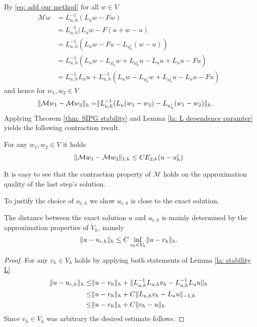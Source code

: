 By \eqref{eq: add our method} for all $w \in V$
\begin{align}
	\mathcal M w &= L_{u,h}^{-1}(L_u w - Fw) \nonumber\\
				 &= L_{u,h}^{-1}(L_u w - F(u+w-u) \nonumber\\
				 &= L_{u,h}^{-1}(L_u w - Fu - L_{u^i_h} (w-u)) \nonumber\\
				 &=  L_{u,h}^{-1}(L_u w - L_{u^i_h} w + L_{u^i_h}u - L_u u + L_u u - Fu) \nonumber\\
				 & = L_{u,h}^{-1} L_u u + L_{u,h}^{-1}(L_u w - L_{u^i_h} w + L_{u^i_h}u - L_u u - Fu) \label{eq: expand M}
 \end{align}
and hence for $w_1, w_2 \in V$
\begin{align*}
	\lVert \mathcal M w_1 - \mathcal M w_2 \rVert_{h} =& \lVert L_{u,h}^{-1}(L_u (w_1-w_2) - L_{u^i_h} (w_1-w_2) \rVert_{h}.
\end{align*}
Applying Theorem \ref{thm: SIPG stability} and Lemma \ref{la: L dependence paramter} yields the following contraction result.
\begin{lemma} \label{la: contraction property M}
	For any $w_1, w_2 \in V$ it holds
\begin{align*}
	\lVert \mathcal M w_1 - \mathcal M w_2 \rVert_{1,h}	\leq C E_{2,h}(u - u^i_h) \label{eq: estimate M}
\end{align*}
\end{lemma}
It is easy to see that the contraction property of $\mathcal{M}$ holds on the approximation quality of the last step's solution. %

To justify the choice of $u_{c,h}$ we show $u_{c,h}$ is close to the exact \MA solution.

\begin{lemma}\label{la: difference u uch}
	The distance between the exact solution $u$ and $u_{c,h}$ is mainly determined by the approximation properties of $V_h$, namely
	\[
		\lVert u-u_{c,h} \rVert_{h} \leq C \inf_{v_h \in V_h} \lVert u-v_h \rVert_{h}.
	\]
\end{lemma}
\begin{proof}
	For any $v_h \in V_h$ holds by applying both statements of Lemma \ref{la: stability L}
	\begin{align}
		\lVert u-u_{c,h} \rVert_{h} \leq& \lVert u- v_h \rVert_{h} + \lVert L_{u,h}^{-1}L_{u,h} v_h- L_{u,h}^{-1}L_u u \rVert_{h} \nonumber \\
						  \leq& \lVert u- v_h \rVert_{h} + C \lVert L_{u,h} v_h-  L_u u \rVert_{-1,h} \nonumber \\
						  \leq& \lVert u- v_h \rVert_{h} + C \lVert v_h -u \rVert_{h} \nonumber
	\end{align}
	Since $v_h \in V_h$ was arbitrary the desired estimate follows.
\end{proof}

